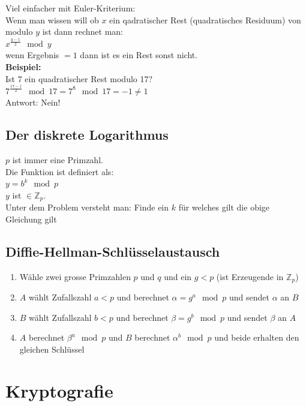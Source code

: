 \documentclass[12pt]{scrartcl}
\begin{document}
Viel einfacher mit Euler-Kriterium:\\
Wenn man wissen will ob $x$ ein qadratischer Rest (quadratisches Residuum) von
modulo $y$ ist dann rechnet man:\\
$x^{\frac{y-1}{2}} \mod y$\\
wenn Ergebnis $=1$ dann ist es ein Rest sonst nicht.\\

\textbf{Beispiel:}\\
Ist 7 ein quadratischer Rest modulo 17?\\
$7^{\frac{17-1}{2}} \mod 17 = 7^8 \mod 17 = -1 \neq 1$\\

Antwort: Nein!


\newpage
\subsection{Der diskrete Logarithmus}
$p$ ist immer eine Primzahl.\\
Die Funktion ist definiert als:\\
$y = b^k \mod p$\\

$y$ ist $\in \mathbb{Z}_p$.\\
Unter dem Problem versteht man: Finde ein $k$ für welches gilt die obige Gleichung gilt\\

\subsection{Diffie-Hellman-Schlüsselaustausch}
\begin{enumerate}
    \item Wähle zwei grosse Primzahlen $p$ und $q$ und ein $g < p$ (ist Erzeugende in $\mathbb{Z}_p$)
    \item $A$ wählt Zufallszahl $a < p$ und berechnet $\alpha = g^a \mod p$ und sendet $\alpha$ an $B$
    \item $B$ wählt Zufallszahl $b < p$ und berechnet $\beta = g^b \mod p$ und sendet $\beta$ an $A$
    \item $A$ berechnet $\beta^a \mod p$ und $B$ berechnet $\alpha^b \mod p$ und beide erhalten den gleichen Schlüssel
\end{enumerate}

\newpage
\section{Kryptografie}
\end{document}

